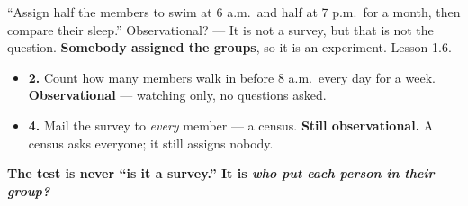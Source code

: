 \documentclass[aspectratio=169, 11pt]{beamer}
\newcommand{\redink}[1]{{\color{redacc}\bfseries #1}}
\begin{document}
\begin{frame}[t, plain]
  \vspace{6pt}
  \begin{block}{``Assign half the members to swim at 6 a.m.\ and half at 7 p.m.\ for a month, then compare their sleep.''}
    Observational? --- It is not a survey, but that is not the question. \redink{Somebody
    assigned the groups}, so it is an experiment. Lesson 1.6.
  \end{block}
  \vspace{8pt}
  \begin{itemize}\setlength{\itemsep}{4pt}
    \item \textbf{2.} Count how many members walk in before 8 a.m.\ every day for a week.
          \redink{Observational} --- watching only, no questions asked.
    \item \textbf{4.} Mail the survey to \emph{every} member --- a census. \redink{Still
          observational.} A census asks everyone; it still assigns nobody.
  \end{itemize}
  \vspace{6pt}
  \begin{center}
    {\color{cerulean}\bfseries The test is never ``is it a survey.'' It is \emph{who put each
    person in their group?}}
  \end{center}
\end{frame}
\end{document}
